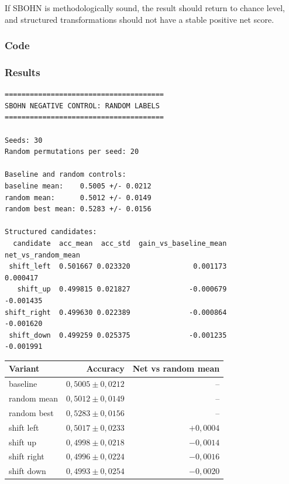 \documentclass[11pt,a4paper]{report}
\begin{document}
If SBOHN is methodologically sound, the result should return to chance level, and structured transformations should not have a stable positive net score.

\subsubsection{Code}

\noindent{}


\subsubsection{Results}

\begin{verbatim}
======================================
SBOHN NEGATIVE CONTROL: RANDOM LABELS
======================================

Seeds: 30
Random permutations per seed: 20

Baseline and random controls:
baseline mean:    0.5005 +/- 0.0212
random mean:      0.5012 +/- 0.0149
random best mean: 0.5283 +/- 0.0156

Structured candidates:
  candidate  acc_mean  acc_std  gain_vs_baseline_mean  net_vs_random_mean
 shift_left  0.501667 0.023320               0.001173            0.000417
   shift_up  0.499815 0.021827              -0.000679           -0.001435
shift_right  0.499630 0.022389              -0.000864           -0.001620
 shift_down  0.499259 0.025375              -0.001235           -0.001991
\end{verbatim}

\begin{center}
\begin{tabular}{lrr}
\toprule
Variant & Accuracy & Net vs random mean \\
\midrule
baseline & $0{,}5005\pm0{,}0212$ & -- \\
random mean & $0{,}5012\pm0{,}0149$ & -- \\
random best & $0{,}5283\pm0{,}0156$ & -- \\
shift left & $0{,}5017\pm0{,}0233$ & $+0{,}0004$ \\
shift up & $0{,}4998\pm0{,}0218$ & $-0{,}0014$ \\
shift right & $0{,}4996\pm0{,}0224$ & $-0{,}0016$ \\
shift down & $0{,}4993\pm0{,}0254$ & $-0{,}0020$ \\
\bottomrule
\end{tabular}
\end{center}
\end{document}
